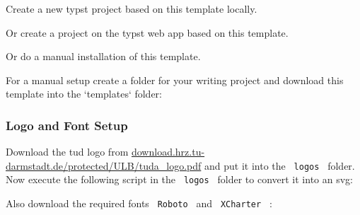 Create a new typst project based on this template locally.

\begin{Shaded}
\begin{Highlighting}[]
\end{Highlighting}
\end{Shaded}

Or create a project on the typst web app based on this template.

Or do a manual installation of this template.

For a manual setup create a folder for your writing project and download
this template into the `templates` folder:

\begin{Shaded}
\begin{Highlighting}[]
\KeywordTok{\&\&} 
\KeywordTok{\&\&} 
\end{Highlighting}
\end{Shaded}

\subsubsection{Logo and Font Setup}\label{logo-and-font-setup}

Download the tud logo from
\href{https://download.hrz.tu-darmstadt.de/protected/ULB/tuda_logo.pdf}{download.hrz.tu-darmstadt.de/protected/ULB/tuda\_logo.pdf}
and put it into the \texttt{\ logos\ } folder. Now execute the following
script in the \texttt{\ logos\ } folder to convert it into an svg:

\begin{Shaded}
\begin{Highlighting}[]
\end{Highlighting}
\end{Shaded}

Also download the required fonts \texttt{\ Roboto\ } and
\texttt{\ XCharter\ } :

\begin{Shaded}
\begin{Highlighting}[]
\end{Highlighting}
\end{Shaded}

